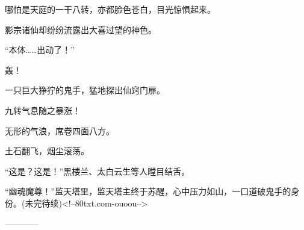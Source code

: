 \begin{this_body}
哪怕是天庭的一干八转，亦都脸色苍白，目光惊惧起来。

影宗诸仙却纷纷流露出大喜过望的神色。

“本体……出动了！”

轰！

一只巨大狰狞的鬼手，猛地探出仙窍门扉。

九转气息随之暴涨！

无形的气浪，席卷四面八方。

土石翻飞，烟尘滚荡。

“这是？这是！”黑楼兰、太白云生等人瞠目结舌。

“幽魂魔尊！”监天塔里，监天塔主终于苏醒，心中压力如山，一口道破鬼手的身份。(未完待续)<!--80txt.com-ouoou-->

------------

\end{this_body}

